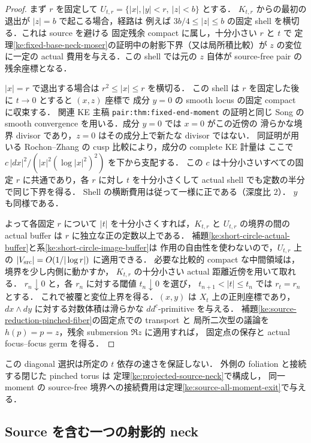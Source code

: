 \begin{proof}
まず $r$ を固定して $U_{t,r}=\{|x|,|y|<r,\ |z|<b\}$ とする．
$K_{t,r}$ からの最初の退出が $|z|=b$ で起こる場合，経路は
例えば $3b/4\le |z|\le b$ の固定 shell を横切る．これは source を避ける
固定残余 compact に属し，十分小さい $r$ と $t$ で
定理\ref{ke:fixed-base-neck-moser}の証明中の射影下界（又は局所積比較）が
$z$ の変位に一定の actual 費用を与える．この shell では元の $z$ 自体が
source-free pair の残余座標となる．

$|x|=r$ で退出する場合は $r^2\le|x|\le r$ を横切る．
この shell は $r$ を固定した後に $t\to0$ とすると $(x,z)$ 座標で
成分 $y=0$ の smooth locus の固定 compact に収束する．
関連 KE 主稿 \texttt{pair:thm:fixed-end-moment} の証明と同じ
Song の smooth convergence を用いる．成分 $y=0$ では $x=0$ がこの近傍の
滑らかな境界 divisor であり，$z=0$ はその成分上で新たな divisor ではない．
同証明が用いる Rochon--Zhang の cusp 比較により，成分の complete KE 計量は
ここで $c\,|dx|^2/(|x|^2(\log|x|^2)^2)$ を下から支配する．
この $c$ は十分小さいすべての固定 $r$ に共通であり，各 $r$ に対し
$t$ を十分小さくして actual shell でも定数の半分で同じ下界を得る．
Shell の横断費用は従って一様に正である（深度比 $2$）．
$y$ も同様である．

よって各固定 $r$ について $|t|$ を十分小さくすれば，$K_{t,r}$ と
$U_{t,r}$ の境界の間の actual buffer は $r$ に独立な正の定数以上である．
補題\ref{ke:short-circle-actual-buffer}と系\ref{ke:short-circle-image-buffer}は
作用の自由性を使わないので，$U_{t,r}$ 上の
$|V_{\rm src}|=O(1/|\log r|)$ に適用できる．
必要な比較的 compact な中間領域は，境界を少し内側に動かすか，
$K_{t,r}$ の十分小さい actual 距離近傍を用いて取れる．
$r_n\downarrow0$ と，各 $r_n$ に対する閾値 $t_n\downarrow0$ を選び，
$t_{n+1}<|t|\le t_n$ では $r_t=r_n$ とする．
これで被覆と変位上界を得る．$(x,y)$ は $X_t$ 上の正則座標であり，
$dx\wedge dy$ に対する対数体積は滑らかな $dd^c$-primitive を与える．
補題\ref{ke:source-reduction-pinched-fiber}の固定点での transport と
局所二次型の議論を $h(p)=p=z$，残余 submersion $\Re z$ に適用すれば，
固定点の保存と actual focus--focus germ を得る．
\end{proof}

この diagonal 選択は所定の $t$ 依存の速さを保証しない．
外側の foliation と接続する閉じた pinched torus は
定理\ref{ke:projected-source-neck}で構成し，
同一 moment の source-free 境界への接続費用は定理\ref{ke:source-all-moment-exit}で与える．

\subsection{Source を含む一つの射影的 neck}

